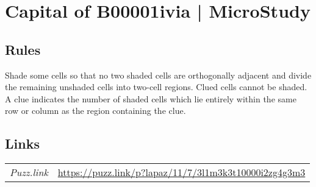\section[Capital of B00001ivia | MicroStudy {[\emph{La Paz}]}]{Capital of B00001ivia | {\normalfont MicroStudy}}
\label{sec:33-capital-of-b00001ivia-microstudy}

\subsection*{Rules}
\begin{markdown}
Shade some cells so that no two shaded cells are orthogonally adjacent and divide the remaining unshaded cells into two-cell regions. Clued cells cannot be shaded. A clue indicates the number of shaded cells which lie entirely within the same row or column as the region containing the clue.
\end{markdown}
\subsection*{Links}
\begin{tabularx}{\textwidth}{l X}
\emph{Puzz.link} & \url{https://puzz.link/p?lapaz/11/7/3l1m3k3t10000i2zg4g3m3} \\
\end{tabularx}
\pagebreak
